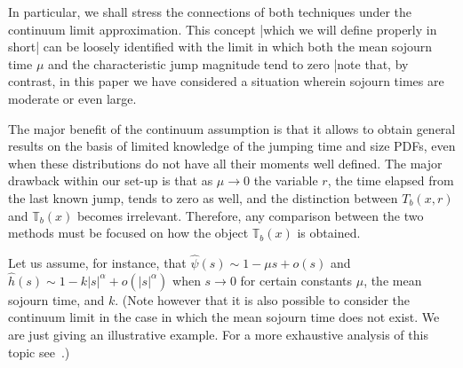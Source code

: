\documentclass[english,aps,a4paper,twocolumn,showpacs,showkeys,amsfonts,amsmath,amssymb,amscd,nofootinbib]{revtex4}
\newcommand{\1}{\'\i}
\newcommand{\TT}{\mathbb{T}}\newcommand{\FF}{\mathbb{F}}
\begin{document}

In particular, we shall stress the connections of both techniques under the continuum limit approximation. This concept  |which  we will define properly in short| can be loosely identified with the limit in which both the mean sojourn time $\mu$ and the characteristic jump magnitude tend to zero |note that, by contrast, in this paper we have considered a situation wherein sojourn times are moderate or even large.

The major benefit of the continuum assumption is that it allows to obtain general results on the basis of limited knowledge of the jumping time and size PDFs, even when these distributions do not have all their moments well defined. The major drawback within our set-up is that as $\mu \to 0$ %
the variable $r$, the time elapsed from the last known jump, tends to zero as well, and the distinction between $T_b(x,r)$ and $\TT_b(x)$ becomes irrelevant. Therefore, any comparison between the two methods must be focused on how the object $\TT_b(x)$ is obtained. 
  

Let us assume, for instance, that $\hat{\psi}(s)\sim 1-\mu s +o(s)$ and $\hat{h}(s)\sim 1-k |s|^{\alpha} +o(|s|^{\alpha})$ when $s\to 0$ for certain constants $\mu$, the mean sojourn time, and $k$. (Note however that it is also possible to consider the continuum limit in the case in which the mean sojourn time does not exist. We are just giving an illustrative example. For a more exhaustive analysis of this topic see~\cite{Metzler}.) 
\end{document}
